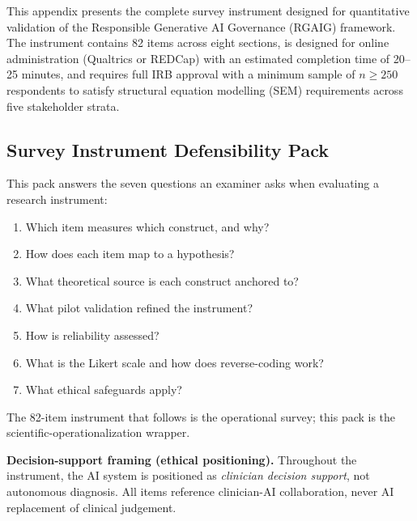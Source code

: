 This appendix presents the complete survey instrument designed for quantitative validation of the Responsible Generative AI Governance (RGAIG) framework. The instrument contains 82 items across eight sections, is designed for online administration (Qualtrics or REDCap) with an estimated completion time of 20--25 minutes, and requires full IRB approval with a minimum sample of $n \geq 250$ respondents to satisfy structural equation modelling (SEM) requirements across five stakeholder strata.


\subsection*{Survey Instrument Defensibility Pack}
\label{sec:survey_defensibility_pack}

\noindent This pack answers the seven questions an examiner asks when evaluating a research instrument:
\begin{enumerate}[leftmargin=*, itemsep=1pt, label=(\arabic*)]
    \item Which item measures which construct, and why?
    \item How does each item map to a hypothesis?
    \item What theoretical source is each construct anchored to?
    \item What pilot validation refined the instrument?
    \item How is reliability assessed?
    \item What is the Likert scale and how does reverse-coding work?
    \item What ethical safeguards apply?
\end{enumerate}
\noindent The 82-item instrument that follows is the operational survey; this pack is the scientific-operationalization wrapper.

\noindent\textbf{Decision-support framing (ethical positioning).} Throughout the instrument, the AI system is positioned as \emph{clinician decision support}, not autonomous diagnosis. All items reference clinician-AI collaboration, never AI replacement of clinical judgement.

